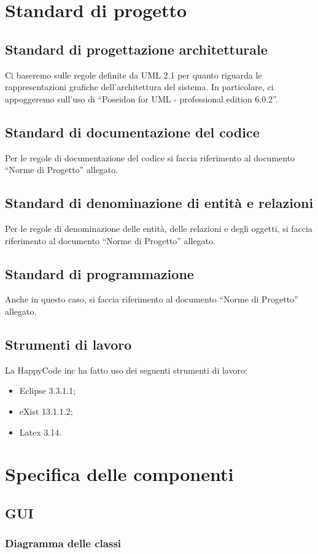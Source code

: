 \documentclass[11pt,titlepage,a4paper]{report}
\begin{document}
\chapter{Standard di progetto}
\section{Standard di progettazione architetturale}
Ci baseremo sulle regole definite da UML 2.1 per quanto riguarda le rappresentazioni grafiche dell'architettura del sistema. In particolare, ci appoggeremo sull'uso di ``Poseidon for UML - professional edition 6.0.2''.
\section{Standard di documentazione del codice}
Per le regole di documentazione del codice si faccia riferimento al documento ``Norme di Progetto'' allegato.
\section{Standard di denominazione di entit\`a e relazioni}
Per le regole di denominazione delle entit\`a, delle relazioni e degli oggetti, si faccia riferimento al documento ``Norme di Progetto'' allegato.
\section{Standard di programmazione}
Anche in questo caso, si faccia riferimento al documento ``Norme di Progetto'' allegato.
\section{Strumenti di lavoro}
La HappyCode inc ha fatto uso dei seguenti strumenti di lavoro:
\begin{itemize}
\item Eclipse 3.3.1.1;
\item eXist 13.1.1.2; 
\item Latex 3.14.
\end{itemize}
\chapter{Specifica delle componenti}
\section{GUI}
\subsection{Diagramma delle classi}
\begin{center}
\end{center}
\end{document}
